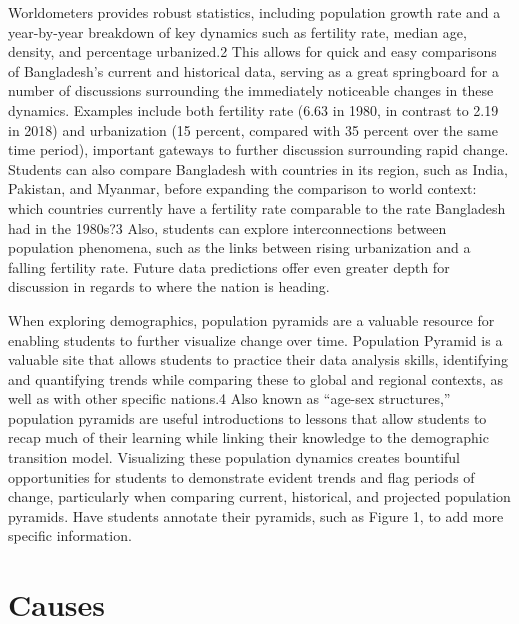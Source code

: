 \documentclass[a4paper,12pt]{article}
\begin{document}
Worldometers provides robust statistics, including population growth rate and a year-by-year breakdown of key dynamics such as fertility rate, median age, density, and percentage urbanized.2 This allows for quick and easy comparisons of Bangladesh’s current and historical data, serving as a great springboard for a number of discussions surrounding the immediately noticeable changes in these dynamics. Examples include both fertility rate (6.63 in 1980, in contrast to 2.19 in 2018) and urbanization (15 percent, compared with 35 percent over the same time period), important gateways to further discussion surrounding rapid change. Students can also compare Bangladesh with countries in its region, such as India, Pakistan, and Myanmar, before expanding the comparison to world context: which countries currently have a fertility rate comparable to the rate Bangladesh had in the 1980s?3 Also, students can explore interconnections between population phenomena, such as the links between rising urbanization and a falling fertility rate. Future data predictions offer even greater depth for discussion in regards to where the nation is heading. \newline

When exploring demographics, population pyramids are a valuable resource for enabling students to further visualize change over time. Population Pyramid is a valuable site that allows students to practice their data analysis skills, identifying and quantifying trends while comparing these to global and regional contexts, as well as with other specific nations.4 Also known as “age-sex structures,” population pyramids are useful introductions to lessons that allow students to recap much of their learning while linking their knowledge to the demographic transition model. Visualizing these population dynamics creates bountiful opportunities for students to demonstrate evident trends and flag periods of change, particularly when comparing current, historical, and projected population pyramids. Have students annotate their pyramids, such as Figure 1, to add more specific information.

\section{Causes}
\end{document}
